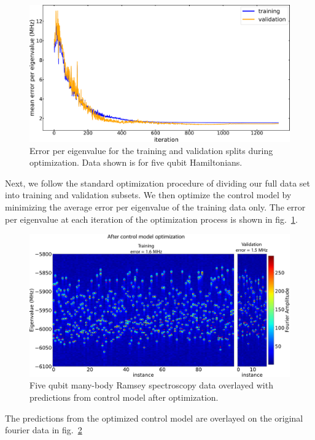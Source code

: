 \begin{figure}[h]
    \begin{center}
        \includegraphics[width=150 mm]{./PDF/tv_error_during_opt.pdf}
    \end{center}
        \caption{
        Error per eigenvalue for the training and validation splits during optimization.
        Data shown is for five qubit Hamiltonians.
        }
    \label{error_during_optimization_training_validation}
\end{figure}
Next, we follow the standard optimization procedure of dividing our full data set into training and validation subsets.
We then optimize the control model by minimizing the average error per eigenvalue of the training data only.
The error per eigenvalue at each iteration of the optimization process is shown in fig.~\ref{error_during_optimization_training_validation}.
\begin{figure}[h]
    \begin{center}
        \includegraphics[width=150 mm]{./PDF/fourier_amp_2d_tv_post.pdf}
    \end{center}
        \caption{
        Five qubit many-body Ramsey spectroscopy data overlayed with predictions from control model after optimization.
        }
    \label{mbr_benchmark_post_optimization}
\end{figure}
The predictions from the optimized control model are overlayed on the original fourier data in fig.~\ref{mbr_benchmark_post_optimization}

